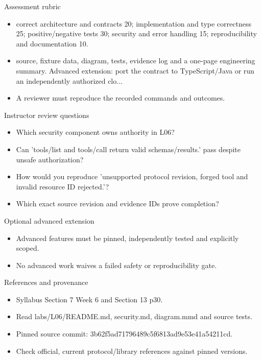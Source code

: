 \documentclass[aspectratio=169,10pt]{beamer}
\begin{document}
\begin{frame}{Assessment rubric}
\small
\begin{itemize}
\item correct architecture and contracts 20; implementation and type correctness 25; positive/negative tests 30; security and error handling 15; reproducibility and documentation 10.
\item source, fixture data, diagram, tests, evidence log and a one-page engineering summary. Advanced extension: port the contract to TypeScript/Java or run an independently authorized clo...
\item A reviewer must reproduce the recorded commands and outcomes.
\end{itemize}

\end{frame}

\begin{frame}{Instructor review questions}
\small
\begin{itemize}
\item Which security component owns authority in L06?
\item Can 'tools/list and tools/call return valid schemas/results.' pass despite unsafe authorization?
\item How would you reproduce 'unsupported protocol revision, forged tool and invalid resource ID rejected.'?
\item Which exact source revision and evidence IDs prove completion?
\end{itemize}

\end{frame}

\begin{frame}{Optional advanced extension}
\small
\begin{itemize}
\item Advanced features must be pinned, independently tested and explicitly scoped.
\item No advanced work waives a failed safety or reproducibility gate.
\end{itemize}

\end{frame}

\begin{frame}{References and provenance}
\small
\begin{itemize}
\item Syllabus Section 7 Week 6 and Section 13 p30.
\item Read labs/L06/README.md, security.md, diagram.mmd and source tests.
\item Pinned source commit: 3b62f5ad71796489c5f6813ad9e53e41a54211cd.
\item Check official, current protocol/library references against pinned versions.
\end{itemize}

\end{frame}
\end{document}

